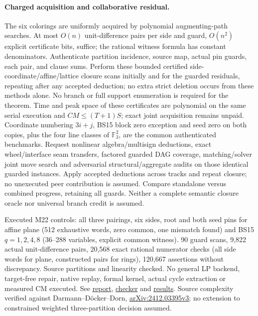 \documentclass[11pt]{article}
\begin{document}
\paragraph{Charged acquisition and collaborative residual.}
The six colorings are uniformly acquired by polynomial augmenting-path searches. At most $O(n)$ unit-difference pairs per side and guard, $O(n^2)$ explicit certificate bits, suffice; the rational witness formula has constant denominators. Authenticate partition incidence, source map, actual pin guards, each pair, and clause sums. Perform these bounded certified side-coordinate/affine/lattice closure scans initially and for the guarded residuals, repeating after any accepted deduction; no extra strict deletion occurs from these methods alone. No branch or full support enumeration is required for the theorem. Time and peak space of these certificates are polynomial on the same serial execution and $CM\le(T+1)S$; exact joint acquisition remains unpaid. Coordinate numbering $3i+j$, BS15 block zero exception and seed zero on both copies, plus the four line classes of $\mathbb F_3^2$, are the common authenticated benchmarks. Request nonlinear algebra/multisign deductions, exact wheel/interface seam transfers, factored guarded DAG coverage, matching/solver joint move search and adversarial structural/aggregate audits on those identical guarded instances. Apply accepted deductions across tracks and repeat closure; no unexecuted peer contribution is assumed. Compare standalone versus combined progress, retaining all guards. Neither a complete semantic closure oracle nor universal branch credit is assumed.

Executed M22 controls: all three pairings, six sides, root and both seed pins for affine plane (512 exhaustive words, zero common, one mismatch found) and BS15 $q=1,2,4,8$ (36--288 variables, explicit common witness). 90 guard scans, 9,822 actual unit-difference pairs, 20,568 exact rational numerator checks (all side words for plane, constructed pairs for rings), 120,667 assertions without discrepancy. Source partitions and linearity checked. No general LP backend, target-free repair, native replay, formal kernel, actual cycle extraction or measured CM executed. See \href{https://github.com/j15marti/pnp/commit/2471b7d365f9f9f77f893e722b553b4f6a06464a}{report}, \href{https://github.com/j15marti/pnp/commit/2163b8eec088a28dab4ff368f5b49465b71cc006}{checker} and \href{https://github.com/j15marti/pnp/commit/a18db5a4183c3a4674a213ebc927bf237c1d396c}{results}. Source complexity verified against Darmann--D\"ocker--Dorn, \href{https://arxiv.org/html/2412.03395v3}{arXiv:2412.03395v3}; no extension to constrained weighted three-partition decision assumed.
\end{document}

